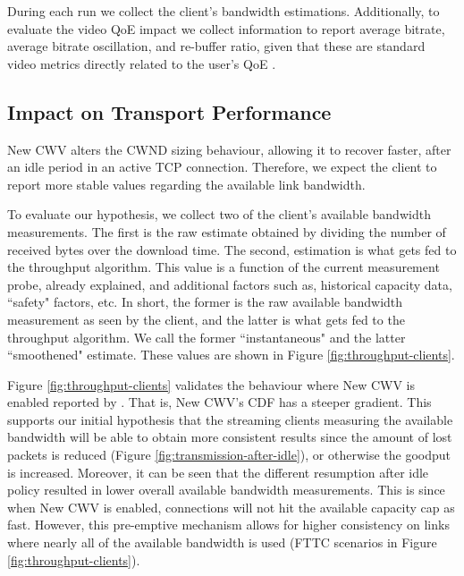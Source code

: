 \documentclass[10pt,sigconf,anonymous]{acmart}
\begin{document}
During each run we collect the client's bandwidth estimations. Additionally, to evaluate the video QoE impact we collect information to report average bitrate, average bitrate oscillation, and re-buffer ratio, given that these are standard video metrics directly related to the user's QoE \cite{Spiteri-2019-from-theory-to-practice-sabre, Yin-2015-a-control-theoritic-approach, Dobrian-2013-understanding-the-impact-of-video-quality}.

\subsection{Impact on Transport Performance} 
\label{sec:transport-impact}

New CWV alters the CWND sizing behaviour, allowing it to recover faster, after an idle period in an active TCP connection. Therefore, we expect the client to report more stable values regarding the available link bandwidth. 

To evaluate our hypothesis, we collect two of the client's available bandwidth measurements. The first is the raw estimate obtained by dividing the number of received bytes over the download time. The second, estimation is what gets fed to the throughput algorithm. This value is a function of the current measurement probe, already explained, and additional factors such as, historical capacity data, ``safety" factors, etc. In short, the former is the raw available bandwidth measurement as seen by the client, and the latter is what gets fed to the throughput algorithm. We call the former ``instantaneous" and the latter ``smoothened" estimate. These values are shown in Figure \ref{fig:throughput-clients}.

Figure \ref{fig:throughput-clients} validates the behaviour where New CWV is enabled reported by \cite{Nazir-2014-performance-evaluation-congestion-window-validation-dash-newcwv}. That is, New CWV's CDF has a steeper gradient. This supports our initial hypothesis that the streaming clients measuring the available bandwidth will be able to obtain more consistent results since the amount of lost packets is reduced (Figure \ref{fig:transmission-after-idle}), or otherwise the goodput is increased. Moreover, it can be seen that the different resumption after idle policy resulted in lower overall available bandwidth measurements. This is since when New CWV is enabled, connections will not hit the available capacity cap as fast. However, this pre-emptive mechanism allows for higher consistency on links where nearly all of the available bandwidth is used (FTTC scenarios in Figure \ref{fig:throughput-clients}).
\end{document}
